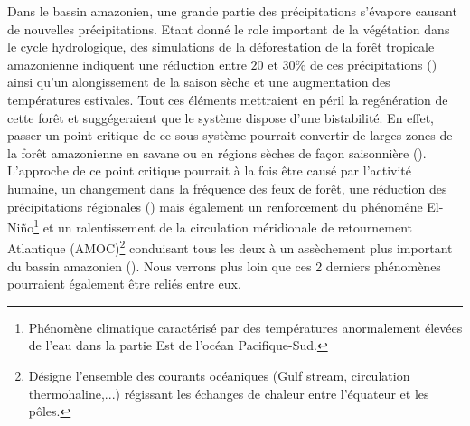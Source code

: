 Dans le bassin amazonien, une grande partie des précipitations s'évapore causant de nouvelles précipitations. Etant donné le role important de la végétation dans le cycle hydrologique, des simulations de la déforestation de la forêt tropicale amazonienne indiquent une réduction entre $20$ et $30\%$ de ces précipitations (\cite{zeng_climatic_1996}) ainsi qu'un alongissement de la saison sèche et une augmentation des températures estivales. Tout ces éléments mettraient en péril la regénération de cette forêt et suggégeraient que le système dispose d'une bistabilité. En effet, passer un point critique de ce sous-système pourrait convertir de larges zones de la forêt amazonienne en savane ou en régions sèches de façon saisonnière (\cite{steffen_trajectories_2018}). L'approche de ce point critique pourrait à la fois être causé par l'activité humaine, un changement dans la fréquence des feux de forêt, une réduction des précipitations régionales (\cite{lenton_tipping_2008}) mais également un renforcement du phénomêne El-Niño\footnote{Phénomène climatique caractérisé par des températures anormalement élevées de l'eau dans la partie Est de l'océan Pacifique-Sud.} et un ralentissement de la circulation méridionale de retournement Atlantique (AMOC)\footnote{Désigne l'ensemble des courants océaniques (Gulf stream, circulation thermohaline,...) régissant les échanges de chaleur entre l'équateur et les pôles.} conduisant tous les deux à un assèchement plus important du bassin amazonien (\cite{lenton_tipping_2008, lenton_climate_2019_too_risky}). Nous verrons plus loin que ces 2 derniers phénomènes pourraient également être reliés entre eux.


